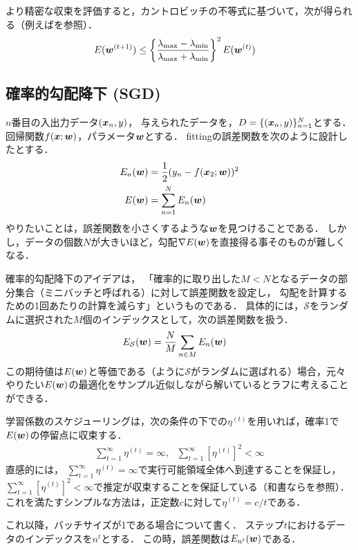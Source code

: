 より精密な収束を評価すると，カントロビッチの不等式に基づいて，次が得られる（例えば\cite{kanamori2016continuous}を参照）．
\begin{align*}
  E(\mbox{\boldmath $w$}^{(t+1)})
  &\le
  \left\{
  \frac{\lambda_{\max} - \lambda_{\min}}
  {\lambda_{\max}+\lambda_{\min}}
  \right\}^2
  E(\mbox{\boldmath $w$}^{(t)})
\end{align*}

\fi



\subsection{確率的勾配降下 (SGD)}
$n$番目の入出力データ$(\mbox{\boldmath $x$}_n,y)$，
与えられたデータを，$D=\{(\mbox{\boldmath $x$}_n,y)\}_{n=1}^N$とする．
回帰関数$f(\mbox{\boldmath $x$};\mbox{\boldmath $w$})$，パラメータ$\mbox{\boldmath $w$}$とする．
fittingの誤差関数を次のように設計したとする．
\begin{align*}
  E_n(\mbox{\boldmath $w$})
  &=\frac{1}{2}(y_n-f(\mbox{\boldmath $x$}_2;\mbox{\boldmath $w$}))^2
  \\
  E(\mbox{\boldmath $w$})
  &=\sum_{n=1}^NE_n(\mbox{\boldmath $w$})
\end{align*}
やりたいことは，誤差関数を小さくするような$\mbox{\boldmath $w$}$を見つけることである．
しかし，データの個数$N$が大きいほど，勾配$\nabla E(\mbox{\boldmath $w$})$を直接得る事そのものが難しくなる．

確率的勾配降下のアイデアは，
「確率的に取り出した$M<N$となるデータの部分集合（ミニバッチと呼ばれる）に対して誤差関数を設定し，
勾配を計算するための1回あたりの計算を減らす」というものである．
具体的には，$\mathcal{S}$をランダムに選択された$M$個のインデックスとして，次の誤差関数を扱う．
\begin{align*}
  E_{\mathcal{S}}(\mbox{\boldmath $w$})
  &=\frac{N}{M}\sum_{n\in M}E_n(\mbox{\boldmath $w$})
\end{align*}
この期待値は$E(\mbox{\boldmath $w$})$と等価である（ように$\mathcal{S}$がランダムに選ばれる）場合，元々やりたい$E(\mbox{\boldmath $w$})$の最適化をサンプル近似しながら解いているとラフに考えることができる．


学習係数のスケジューリングは，次の条件の下での$\eta^{(t)}$を用いれば，確率1で$E(\mbox{\boldmath $w$})$の停留点に収束する．
\begin{align*}
  \sum_{t=1}^\infty\eta^{(t)}=\infty,~~~\sum_{t=1}^\infty[\eta^{(t)}]^2<\infty
\end{align*}
直感的には，
$\sum_{t=1}^\infty\eta^{(t)}=\infty$で実行可能領域全体へ到達することを保証し，
$\sum_{t=1}^\infty[\eta^{(t)}]^2<\infty$で推定が収束することを保証している（和書なら\cite{suzuki2015stochastic}を参照）．
これを満たすシンプルな方法は，正定数$c$に対して$\eta^{(t)}=c/t$である．

これ以降，バッチサイズが1である場合について書く．
ステップ$t$におけるデータのインデックスを$n^t$とする．
この時，誤差関数は$E_{n^t}(\mbox{\boldmath $w$})$である．


